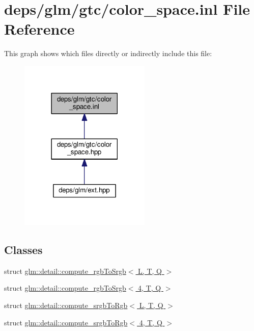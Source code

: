 \hypertarget{gtc_2color__space_8inl}{}\section{deps/glm/gtc/color\+\_\+space.inl File Reference}
\label{gtc_2color__space_8inl}
This graph shows which files directly or indirectly include this file\+:
\nopagebreak
\begin{figure}[H]
\begin{center}
\leavevmode
\includegraphics[width=177pt]{db/dc5/gtc_2color__space_8inl__dep__incl}
\end{center}
\end{figure}
\subsection*{Classes}
\begin{DoxyCompactItemize}
\item 
struct \hyperlink{structglm_1_1detail_1_1compute__rgbToSrgb}{glm\+::detail\+::compute\+\_\+rgb\+To\+Srgb$<$ L, T, Q $>$}
\item 
struct \hyperlink{structglm_1_1detail_1_1compute__rgbToSrgb_3_014_00_01T_00_01Q_01_4}{glm\+::detail\+::compute\+\_\+rgb\+To\+Srgb$<$ 4, T, Q $>$}
\item 
struct \hyperlink{structglm_1_1detail_1_1compute__srgbToRgb}{glm\+::detail\+::compute\+\_\+srgb\+To\+Rgb$<$ L, T, Q $>$}
\item 
struct \hyperlink{structglm_1_1detail_1_1compute__srgbToRgb_3_014_00_01T_00_01Q_01_4}{glm\+::detail\+::compute\+\_\+srgb\+To\+Rgb$<$ 4, T, Q $>$}
\end{DoxyCompactItemize}
